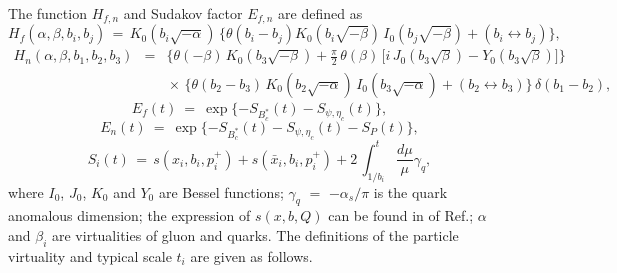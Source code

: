 \documentclass[preprint,superscriptaddress,nofootinbib]{revtex4}
\begin{document}
\begin{appendix}
  The function $H_{f,n}$ and Sudakov factor $E_{f,n}$ are defined as
   \begin{equation}
   H_{f}({\alpha},{\beta},b_{i},b_{j})\, =\,
   K_{0}(b_{i}\sqrt{-{\alpha}})\, \Big\{
   {\theta}(b_{i}-b_{j}) K_{0}(b_{i}\sqrt{-{\beta}})\,
   I_{0}(b_{j}\sqrt{-{\beta}})
   + (b_{i} {\leftrightarrow} b_{j}) \Big\}
   \label{amp:hf},
   \end{equation}
   \begin{eqnarray}
  H_{n}({\alpha},{\beta},b_{1},b_{2},b_{3}) &=&
  \Big\{ {\theta}(-{\beta})\, K_{0}(b_{3}\sqrt{-{\beta}})
  +\frac{{\pi}}{2}\,
  {\theta}({\beta})\, \Big[ i\,J_{0}(b_{3}\sqrt{{\beta}})
   - Y_{0}(b_{3}\sqrt{{\beta}}) \Big] \Big\}
   \nonumber \\ && \!\!\!\! \!\!\!\! \!\!\!\! \!\!\!\! \!\!\!\!  {\times}\,
   \Big\{ {\theta}(b_{2}-b_{3})\, K_{0}(b_{2}\sqrt{-{\alpha}})\,
   I_{0}(b_{3}\sqrt{-{\alpha}}) + (b_{2} {\leftrightarrow} b_{3})
   \Big\}\, {\delta}(b_{1}-b_{2})
   \label{amp:hn},
   \end{eqnarray}
   \begin{equation}
   E_{f}(t)\ =\ {\exp}\{ -S_{B_{c}^{\ast}}(t)-S_{{\psi},{\eta}_{c}}(t) \}
   \label{sudakov-ef},
   \end{equation}
   \begin{equation}
   E_{n}(t)\ =\ {\exp}\{ -S_{B_{c}^{\ast}}(t)-S_{{\psi},{\eta}_{c}}(t)-S_{P}(t) \}
   \label{sudakov-n},
   \end{equation}
  \begin{equation}
  S_{i}(t)\, =\, s(x_{i},b_{i},p_{i}^{+}) + s(\bar{x}_{i},b_{i},p_{i}^{+})
  +2\,{\int}_{1/b_{i}}^{t}\frac{d{\mu}}{\mu}{\gamma}_{q}
   \label{sudakov-cm},
   \end{equation}
  where $I_{0}$, $J_{0}$, $K_{0}$ and $Y_{0}$ are Bessel functions;
  ${\gamma}_{q}$ $=$ $-{\alpha}_{s}/{\pi}$ is the quark anomalous
  dimension; the expression of $s(x,b,Q)$ can be found in of
  Ref.\cite{pqcd1};
  ${\alpha}$ and ${\beta}_{i}$ are virtualities of gluon and quarks.
  The definitions of the particle virtuality and typical
  scale $t_{i}$ are given as follows.

\end{appendix}
\end{document}
